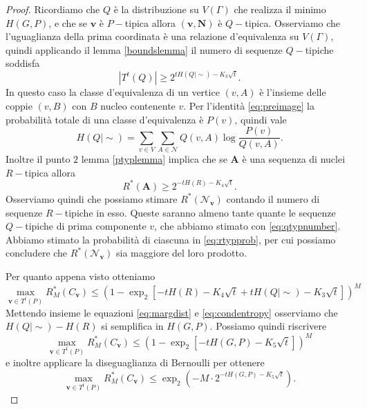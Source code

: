 \begin{proof}
	Ricordiamo che \(Q\) è la distribuzione su \(V(\Gamma)\) che realizza il minimo \(H(G,P)\), e che se \(\mathbf{v}\) è \(P-\)tipica allora \((\mathbf{v}, \mathbf{N})\) è \(Q-\)tipica. Osserviamo che l'uguaglianza della prima coordinata è una relazione d'equivalenza su \(V(\Gamma)\), quindi applicando il lemma \ref{boundslemma} il numero di sequenze \(Q-\)tipiche soddisfa 
	\begin{equation}
		\label{eq:qtypnumber} \left\vert T^{t}(Q)\right\vert \ge 2^{tH(Q\mid\sim)-K_{3}\sqrt{t}}. 
	\end{equation}
	In questo caso la classe d'equivalenza di un vertice \((v,A)\) è l'insieme delle coppie \((v,B)\) con \(B\) nucleo contenente \(v\). Per l'identità \eqref{eq:preimage} la probabilità totale di una classe d'equivalenza è \(P(v)\), quindi vale 
	\begin{equation}
		\label{eq:condentropy} H(Q\mid\sim)=\sum_{v\in V} \sum_{A\in \mathcal{N}} Q(v,A)\log{\frac{P(v)}{Q(v,A)}}. 
	\end{equation}
	Inoltre il punto \(2\) lemma \ref{ptyplemma} implica che se \(\mathbf{A}\) è una sequenza di nuclei \(R-\)tipica allora 
	\begin{equation}
		\label{eq:rtypprob} R^{*}(\mathbf{A})\ge 2^{-tH(R)-K_{4}\sqrt{t}}. 
	\end{equation}
	Osserviamo quindi che possiamo stimare \(R^{*}(\mathcal{N}_{\mathbf{v}})\) contando il numero di sequenze \(R-\)tipiche in esso. Queste saranno almeno tante quante le sequenze \(Q-\)tipiche di prima componente \(v\), che abbiamo stimato con \eqref{eq:qtypnumber}. Abbiamo stimato la probabilità di ciascuna in \eqref{eq:rtypprob}, per cui possiamo concludere che \(R^{*}(\mathcal{N}_{\mathbf{v}})\) sia maggiore del loro prodotto.
	
	Per quanto appena visto otteniamo 
	\begin{equation}
		\max_{\mathbf{v}\in T^t(P)} R_{M}^{*}(C_{\mathbf{v}})\le \left(1- \exp_{2}{\left[-tH(R) - K_{4}\sqrt{t} + tH(Q\mid\sim) - K_{3}\sqrt{t}\right]}\right)^{M} 
	\end{equation}
	Mettendo insieme le equazioni \eqref{eq:margdist} e \eqref{eq:condentropy} osserviamo che \(H(Q\mid\sim) - H(R)\) si semplifica in \(H(G,P)\). Possiamo quindi riscrivere
	\[\max_{\mathbf{v}\in T^t(P)} R_{M}^{*}(C_{\mathbf{v}})\le \left(1- \exp_{2}{\left[-tH(G,P) - K_{5}\sqrt{t}\right]}\right)^{M}\]
	e inoltre applicare la diseguaglianza di Bernoulli per ottenere
	\[\max_{\mathbf{v}\in T^t(P)} R_{M}^{*}(C_{\mathbf{v}})\le \exp_{2}\left(-M\cdot 2^{-tH(G,P) - K_{5}\sqrt{t}}\right).\]
	

\end{proof}
